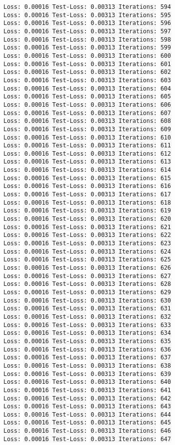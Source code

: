\documentclass[11pt]{article}
\begin{document}
\begin{Verbatim}[commandchars=\\\{\}]
Loss: 0.00016 Test-Loss: 0.00313 Iterations: 594
Loss: 0.00016 Test-Loss: 0.00313 Iterations: 595
Loss: 0.00016 Test-Loss: 0.00313 Iterations: 596
Loss: 0.00016 Test-Loss: 0.00313 Iterations: 597
Loss: 0.00016 Test-Loss: 0.00313 Iterations: 598
Loss: 0.00016 Test-Loss: 0.00313 Iterations: 599
Loss: 0.00016 Test-Loss: 0.00313 Iterations: 600
Loss: 0.00016 Test-Loss: 0.00313 Iterations: 601
Loss: 0.00016 Test-Loss: 0.00313 Iterations: 602
Loss: 0.00016 Test-Loss: 0.00313 Iterations: 603
Loss: 0.00016 Test-Loss: 0.00313 Iterations: 604
Loss: 0.00016 Test-Loss: 0.00313 Iterations: 605
Loss: 0.00016 Test-Loss: 0.00313 Iterations: 606
Loss: 0.00016 Test-Loss: 0.00313 Iterations: 607
Loss: 0.00016 Test-Loss: 0.00313 Iterations: 608
Loss: 0.00016 Test-Loss: 0.00313 Iterations: 609
Loss: 0.00016 Test-Loss: 0.00313 Iterations: 610
Loss: 0.00016 Test-Loss: 0.00313 Iterations: 611
Loss: 0.00016 Test-Loss: 0.00313 Iterations: 612
Loss: 0.00016 Test-Loss: 0.00313 Iterations: 613
Loss: 0.00016 Test-Loss: 0.00313 Iterations: 614
Loss: 0.00016 Test-Loss: 0.00313 Iterations: 615
Loss: 0.00016 Test-Loss: 0.00313 Iterations: 616
Loss: 0.00016 Test-Loss: 0.00313 Iterations: 617
Loss: 0.00016 Test-Loss: 0.00313 Iterations: 618
Loss: 0.00016 Test-Loss: 0.00313 Iterations: 619
Loss: 0.00016 Test-Loss: 0.00313 Iterations: 620
Loss: 0.00016 Test-Loss: 0.00313 Iterations: 621
Loss: 0.00016 Test-Loss: 0.00313 Iterations: 622
Loss: 0.00016 Test-Loss: 0.00313 Iterations: 623
Loss: 0.00016 Test-Loss: 0.00313 Iterations: 624
Loss: 0.00016 Test-Loss: 0.00313 Iterations: 625
Loss: 0.00016 Test-Loss: 0.00313 Iterations: 626
Loss: 0.00016 Test-Loss: 0.00313 Iterations: 627
Loss: 0.00016 Test-Loss: 0.00313 Iterations: 628
Loss: 0.00016 Test-Loss: 0.00313 Iterations: 629
Loss: 0.00016 Test-Loss: 0.00313 Iterations: 630
Loss: 0.00016 Test-Loss: 0.00313 Iterations: 631
Loss: 0.00016 Test-Loss: 0.00313 Iterations: 632
Loss: 0.00016 Test-Loss: 0.00313 Iterations: 633
Loss: 0.00016 Test-Loss: 0.00313 Iterations: 634
Loss: 0.00016 Test-Loss: 0.00313 Iterations: 635
Loss: 0.00016 Test-Loss: 0.00313 Iterations: 636
Loss: 0.00016 Test-Loss: 0.00313 Iterations: 637
Loss: 0.00016 Test-Loss: 0.00313 Iterations: 638
Loss: 0.00016 Test-Loss: 0.00313 Iterations: 639
Loss: 0.00016 Test-Loss: 0.00313 Iterations: 640
Loss: 0.00016 Test-Loss: 0.00313 Iterations: 641
Loss: 0.00016 Test-Loss: 0.00313 Iterations: 642
Loss: 0.00016 Test-Loss: 0.00313 Iterations: 643
Loss: 0.00016 Test-Loss: 0.00313 Iterations: 644
Loss: 0.00016 Test-Loss: 0.00313 Iterations: 645
Loss: 0.00016 Test-Loss: 0.00313 Iterations: 646
Loss: 0.00016 Test-Loss: 0.00313 Iterations: 647

\end{Verbatim}
\end{document}
